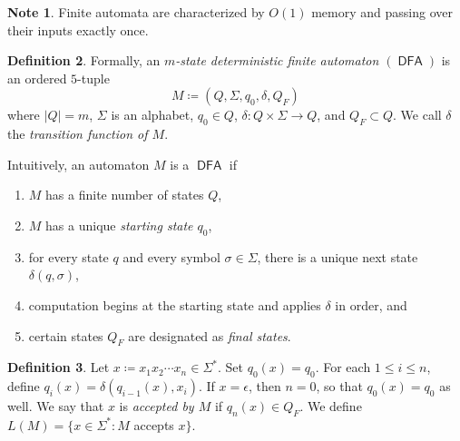\documentclass[10pt,letterpaper,cm]{nupset}
\theoremstyle{definition}
\newtheorem{definition}{Definition}[subsection]
\newtheorem{note}[definition]{Note}
\theoremstyle{theorem}
\theoremstyle{remark}
\newcommand{\1}{\mathbf{1}}
\newcommand{\0}{\vec 0}
\DeclareMathOperator{\DFA}{\mathsf{DFA}}
\begin{document}
\begin{note}
Finite automata are characterized by $O(1)$ memory and passing over their inputs exactly once.
\end{note}
\begin{definition}
Formally, an \textit{$m$-state deterministic finite automaton $(\DFA)$}  is an ordered $5$-tuple $$M\coloneqq (Q, \Sigma, q_0, \delta, Q_F)  $$ where  $|Q| = m$, $\Sigma$ is an alphabet, $q_0\in Q$, $\delta : Q\times \Sigma \to Q$, and $Q_F\subset Q$. We call $\delta$ the \textit{transition function of $M$}.

\medskip


Intuitively, an automaton $M$ is a $\DFA$ if
\begin{enumerate}[label=(\alph*)]
\item $M$ has a finite number of states $Q$,
\item $M$ has a unique \textit{starting state $q_0$},
\item for every state $q$ and every symbol $\sigma \in \Sigma$, there is a unique next state $\delta(q, \sigma)$,
\item computation begins at the starting state and applies $\delta$ in order, and
\item certain states $Q_F$ are designated as \textit{final states}.
\end{enumerate}
\end{definition}

\begin{definition}
Let $x\coloneqq x_1x_2\cdots x_n \in \Sigma^{\ast}$. Set $q_0(x) = q_0$. For each $1\leq i\leq n$, define $q_i(x) =\delta(q_{i-1}(x), x_i)$. If $x= \epsilon$, then $n=0$, so that $q_0(x) = q_0$ as well. We say that $x$ is \textit{accepted by $M$} if $q_n(x) \in Q_F$. We define $L(M) =\{x\in \Sigma^{\ast} : M$ accepts $x\}$.
\end{definition}
\end{document}
